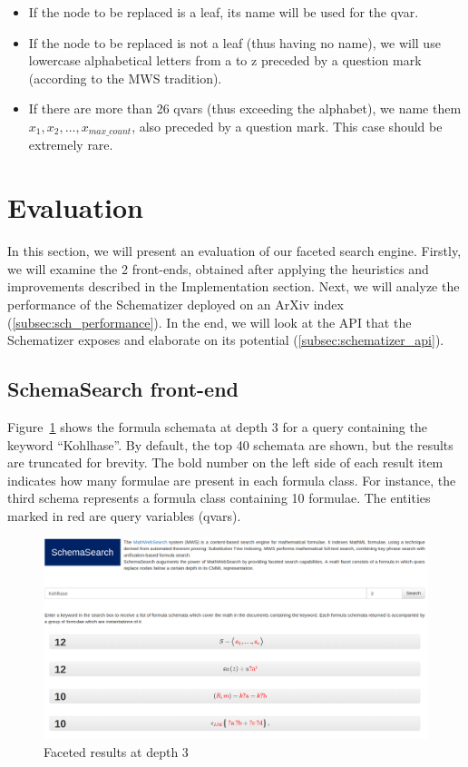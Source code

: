 \documentclass[a4paper,oneside]{article}
\def\MWS{\textsf{MWS}\xspace}
\def\arxiv{\textsf{ArXiv}\xspace}
\begin{document}
\begin{itemize}
    \item If the node to be replaced is a leaf, its name will be used for the
        qvar.
    \item If the node to be replaced is not a leaf (thus having no name), we
        will use lowercase alphabetical letters from \textsf{a} to \textsf{z}
        preceded by a question mark (according to the \MWS tradition).
    \item If there are more than 26 qvars (thus exceeding the alphabet), we
        name them $x_{1}, x_{2}, \ldots, x_{max\_count}$, also preceded by a
        question mark. This case should be extremely rare.
\end{itemize}

\section{Evaluation}\label{sec:evaluation}

In this section, we will present an evaluation of our faceted search engine.
Firstly, we will examine the 2 front-ends, obtained after applying the
heuristics and improvements described in the Implementation section. Next, we
will analyze the performance of the Schematizer deployed on an \arxiv index
(\ref{subsec:sch_performance}). In the end, we will look at the API that the
Schematizer exposes and elaborate on its potential
(\ref{subsec:schematizer_api}).

\subsection{SchemaSearch front-end}\label{subsec:fe_results_display1}
Figure~\ref{fig:schemata_group} shows the formula schemata at depth 3 for a
query containing the keyword ``Kohlhase''. By default, the top 40 schemata are
shown, but the results are truncated for brevity.
The bold number on the left side of each result item indicates how many
formulae are present in each formula class. For instance, the third schema
represents a formula class containing 10 formulae. The entities marked in red
are query variables (qvars).

\begin{figure}[ht]\centering
    \includegraphics[width=12.8cm]{img/schemataGroup.png}
    \caption{Faceted results at depth 3}\label{fig:schemata_group}
\end{figure}
\FloatBarrier
\end{document}
